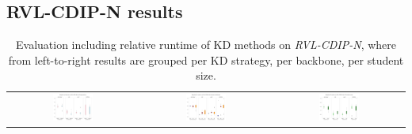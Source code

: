\subsection{RVL-CDIP-N results}\label{sec:supp-N}

\begin{table}[h]
  \centering
  \caption{Evaluation including relative runtime of KD methods on \textit{RVL-CDIP-N}, where from left-to-right results are grouped per KD strategy, per backbone, per student size.}
  \label{tab:rvl_n}
  \begin{tabular}{ccc}
    \includegraphics[width=0.33\textwidth]{images/N_results_perKDapproach.png}               &
    \includegraphics[width=0.33\textwidth]{images/N_results_perbackboneincludingteacher.png} &
    \includegraphics[width=0.33\textwidth]{images/N_results_perstudentsizes.png}               \\
  \end{tabular}
\end{table}

